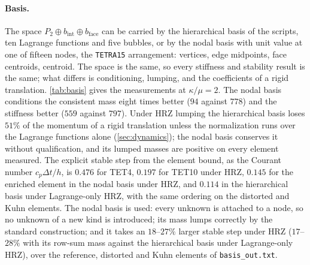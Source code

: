 \documentclass{article}
\newcommand{\code}[1]{\texttt{#1}}
\theoremstyle{definition}
\theoremstyle{plain}
\begin{document}
\paragraph{Basis.} The space $P_2 \oplus b_{\mathrm{int}} \oplus
b_{\mathrm{face}}$ can be carried by the hierarchical basis of the scripts,
ten Lagrange functions and five bubbles, or by the nodal basis with unit value
at one of fifteen nodes, the \code{TETRA15} arrangement: vertices, edge
midpoints, face centroids, centroid. The space is the same, so every
stiffness and stability result is the same; what differs is conditioning,
lumping, and the coefficients of a rigid translation. \cref{tab:basis}
gives the measurements at $\kappa/\mu = 2$. The nodal basis conditions the
consistent mass eight times better ($94$ against $778$) and the stiffness
better ($559$ against $797$). Under HRZ lumping the hierarchical basis loses
$51\%$ of the momentum of a rigid translation unless the normalization runs
over the Lagrange functions alone (\cref{sec:dynamics}); the nodal basis conserves it without
qualification, and its lumped masses are positive on every element
measured. The explicit stable step from the element bound, as the Courant
number $c_p\Delta t/h$, is $0.476$ for TET4, $0.197$ for
TET10 under HRZ, $0.145$ for the enriched element in the nodal
basis under HRZ, and $0.114$ in the hierarchical basis under Lagrange-only
HRZ, with the same ordering on the distorted and Kuhn elements. The nodal
basis is used: every unknown is attached to a node, so no unknown of a new
kind is introduced; its mass lumps correctly by the standard construction;
and it takes an $18$--$27\%$ larger stable step under HRZ ($17$--$28\%$ with its row-sum mass against the hierarchical basis under Lagrange-only HRZ), over the reference, distorted and Kuhn elements of \code{basis\_out.txt}.
\end{document}
